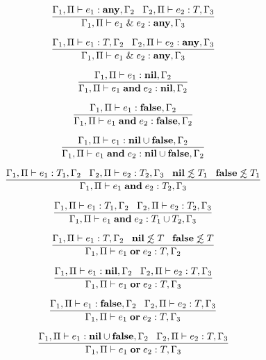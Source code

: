 \[
\dfrac{\Gamma_{1}, \Pi \vdash e_{1}:\mathbf{any}, \Gamma_{2} \;\;\;
       \Gamma_{2}, \Pi \vdash e_{2}:T, \Gamma_{3}}
      {\Gamma_{1}, \Pi \vdash e_{1} \;\&\; e_{2}:\mathbf{any}, \Gamma_{3}}
\]

\[
\dfrac{\Gamma_{1}, \Pi \vdash e_{1}:T, \Gamma_{2} \;\;\;
       \Gamma_{2}, \Pi \vdash e_{2}:\mathbf{any}, \Gamma_{3}}
      {\Gamma_{1}, \Pi \vdash e_{1} \;\&\; e_{2}:\mathbf{any}, \Gamma_{3}}
\]

\[
\dfrac{\Gamma_{1}, \Pi \vdash e_{1}:\mathbf{nil}, \Gamma_{2}}
      {\Gamma_{1}, \Pi \vdash e_{1} \; \mathbf{and} \; e_{2}:\mathbf{nil}, \Gamma_{2}}
\]

\[
\dfrac{\Gamma_{1}, \Pi \vdash e_{1}:\mathbf{false}, \Gamma_{2}}
      {\Gamma_{1}, \Pi \vdash e_{1} \; \mathbf{and} \; e_{2}:\mathbf{false}, \Gamma_{2}}
\]

\[
\dfrac{\Gamma_{1}, \Pi \vdash e_{1}:\mathbf{nil} \cup \mathbf{false}, \Gamma_{2}}
      {\Gamma_{1}, \Pi \vdash e_{1} \; \mathbf{and} \; e_{2}:\mathbf{nil} \cup \mathbf{false}, \Gamma_{2}}
\]

\[
\dfrac{\Gamma_{1}, \Pi \vdash e_{1}:T_{1}, \Gamma_{2} \;\;\;
       \Gamma_{2}, \Pi \vdash e_{2}:T_{2}, \Gamma_{3} \;\;\;
       \mathbf{nil} \not\lesssim T_{1} \;\;\;
       \mathbf{false} \not\lesssim T_{1}}
      {\Gamma_{1}, \Pi \vdash e_{1} \; \mathbf{and} \; e_{2}:T_{2}, \Gamma_{3}}
\]

\[
\dfrac{\Gamma_{1}, \Pi \vdash e_{1}:T_{1}, \Gamma_{2} \;\;\;
       \Gamma_{2}, \Pi \vdash e_{2}:T_{2}, \Gamma_{3}}
      {\Gamma_{1}, \Pi \vdash e_{1} \; \mathbf{and} \; e_{2}:T_{1} \cup T_{2}, \Gamma_{3}}
\]

\[
\dfrac{\Gamma_{1}, \Pi \vdash e_{1}:T, \Gamma_{2} \;\;\;
       \mathbf{nil} \not\lesssim T \;\;\;
       \mathbf{false} \not\lesssim T}
      {\Gamma_{1}, \Pi \vdash e_{1} \; \mathbf{or} \; e_{2}:T, \Gamma_{2}}
\]

\[
\dfrac{\Gamma_{1}, \Pi \vdash e_{1}:\mathbf{nil}, \Gamma_{2} \;\;\;
       \Gamma_{2}, \Pi \vdash e_{2}:T, \Gamma_{3}}
      {\Gamma_{1}, \Pi \vdash e_{1} \; \mathbf{or} \; e_{2}:T, \Gamma_{3}}
\]

\[
\dfrac{\Gamma_{1}, \Pi \vdash e_{1}:\mathbf{false}, \Gamma_{2} \;\;\;
       \Gamma_{2}, \Pi \vdash e_{2}:T, \Gamma_{3}}
      {\Gamma_{1}, \Pi \vdash e_{1} \; \mathbf{or} \; e_{2}:T, \Gamma_{3}}
\]

\[
\dfrac{\Gamma_{1}, \Pi \vdash e_{1}:\mathbf{nil} \cup \mathbf{false}, \Gamma_{2} \;\;\;
       \Gamma_{2}, \Pi \vdash e_{2}:T, \Gamma_{3}}
      {\Gamma_{1}, \Pi \vdash e_{1} \; \mathbf{or} \; e_{2}:T, \Gamma_{3}}
\]

